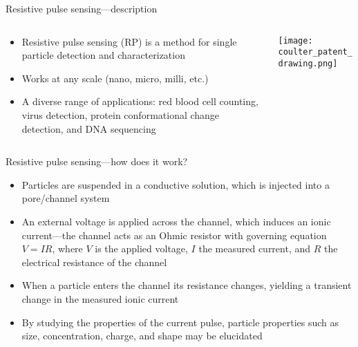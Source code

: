 \begin{frame}[c]{Resistive pulse sensing---description}
	
	\begin{columns}[t]
		\begin{column}[T]{2.75in}
	
			\begin{itemize}
				\item Resistive pulse sensing (RP) is a method for single particle detection and characterization
				\item Works at any scale (nano, micro, milli, etc.)
				\item A diverse range of applications: red blood cell counting, virus detection, protein conformational change detection, and DNA sequencing
			\end{itemize}
	
		\end{column}
		
		\begin{column}[T]{1.75in}
			\texttt{[image: coulter\_patent\_drawing.png]}
		\end{column}
		
	\end{columns}

	
\end{frame}





\begin{frame}[c]{Resistive pulse sensing---how does it work?}

	\begin{tiny}
		\begin{itemize}
		
			\item Particles are suspended in a conductive solution, which is injected into a pore/channel system
			\item An external voltage is applied across the channel, which induces an ionic current---the channel acts as an Ohmic resistor with governing equation $V=IR$, where $V$ is the applied voltage, $I$ the measured current, and $R$ the electrical resistance of the channel
			\item When a particle enters the channel its resistance changes, yielding a transient change in the measured ionic current
			\item By studying the properties of the current pulse, particle properties such as size, concentration, charge, and shape may be elucidated
		\end{itemize}
	\end{tiny}
	
\end{frame}




